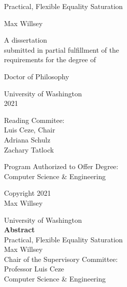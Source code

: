 \documentclass[12pt, oneside]{report}
\title{\mytitle}
\author{\myauthor}
\def\mytitle{Practical, Flexible Equality Saturation}
\def\myauthor{Max Willsey}
\def\year{2021}
\begin{document}
\pagestyle{empty}

\begin{center}
  {\huge \mytitle}
  \vfill

  {\Large \myauthor}
  \vfill

  \begin{spacing}{1}
    A dissertation \\
    submitted in partial fulfillment of the \\
    requirements for the degree of
  \end{spacing}
  \vfill

  Doctor of Philosophy
  \vfill

  University of Washington \\
  \year
  \vfill

  Reading Commitee: \\
  Luis Ceze, Chair \\
  Adriana Schulz \\
  Zachary Tatlock
  \vfill

  \begin{spacing}{1}
    Program Authorized to Offer Degree: \\
    Computer Science \& Engineering
  \end{spacing}
  \clearpage

  \textcopyright{} Copyright \year\\
  \myauthor
  \clearpage
\end{center}

\pagestyle{plain}

\setcounter{page}{1}

\begin{center}
  University of Washington \\[1em]
  \textbf{Abstract}        \\[1em]
  \mytitle                 \\[1em]
  \myauthor                \\[1em]

  Chair of the Supervisory Committee: \\[-0.5em]
  Professor Luis Ceze                 \\[-0.5em]
  Computer Science \& Engineering
  \\[2em]
\end{center}

\clearpage

\begin{spacing}{1.5}
  \tableofcontents
\end{spacing}
\end{document}
